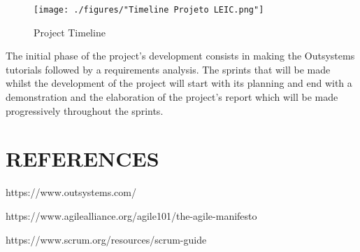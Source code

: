 \documentclass[a4paper,openright,12pt]{report}
\begin{document}
\begin{figure}[h]
  \texttt{[image: ./figures/"Timeline Projeto LEIC.png"]}
  \caption{Project Timeline}
  \label{fig:schedule}
\end{figure}

The initial phase of the project's development consists in making the Outsystems tutorials followed by a requirements analysis. The sprints that will be made whilst the development of the project will start with its planning and end with a demonstration and the elaboration of the project's report which will be made progressively throughout the sprints.

\section*{REFERENCES}

\par
[1] https://www.outsystems.com/ \par
[2] https://www.agilealliance.org/agile101/the-agile-manifesto \par
[3] https://www.scrum.org/resources/scrum-guide
\end{document}
